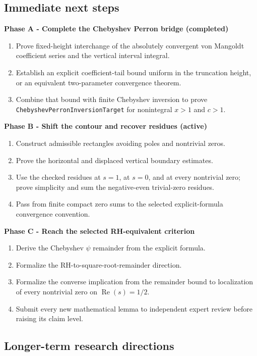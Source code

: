 \documentclass[11pt,a4paper]{article}
\newcommand{\code}[1]{\texttt{#1}}
\newcommand{\RePart}{\operatorname{Re}}
\begin{document}
\subsection{Immediate next steps}

\textbf{Phase A - Complete the Chebyshev Perron bridge (completed)}
\begin{enumerate}
  \item Prove fixed-height interchange of the absolutely convergent von
  Mangoldt coefficient series and the vertical interval integral.
  \item Establish an explicit coefficient-tail bound uniform in the truncation
  height, or an equivalent two-parameter convergence theorem.
  \item Combine that bound with finite Chebyshev inversion to prove
  \code{ChebyshevPerronInversionTarget} for nonintegral $x>1$ and $c>1$.
\end{enumerate}

\textbf{Phase B - Shift the contour and recover residues (active)}
\begin{enumerate}
  \item Construct admissible rectangles avoiding poles and nontrivial zeros.
  \item Prove the horizontal and displaced vertical boundary estimates.
  \item Use the checked residues at $s=1$, at $s=0$, and at every nontrivial
  zero; prove simplicity and sum the negative-even trivial-zero residues.
  \item Pass from finite compact zero sums to the selected explicit-formula
  convergence convention.
\end{enumerate}

\textbf{Phase C - Reach the selected RH-equivalent criterion}
\begin{enumerate}
  \item Derive the Chebyshev $\psi$ remainder from the explicit formula.
  \item Formalize the RH-to-square-root-remainder direction.
  \item Formalize the converse implication from the remainder bound to
  localization of every nontrivial zero on $\RePart(s)=1/2$.
  \item Submit every new mathematical lemma to independent expert review before
  raising its claim level.
\end{enumerate}

\subsection{Longer-term research directions}
\end{document}
